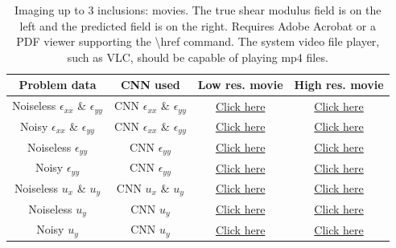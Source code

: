 \documentclass[12pt]{article}
\begin{document}
\begin{table}
  \centering
  \begin{tabular}{|c|c|c|c|}
    \hline
    Problem data & CNN used & Low res. movie  & High res. movie\\
    \hline
    Noiseless $\epsilon_{xx}$ \& $\epsilon_{yy}$ & CNN $\epsilon_{xx}$ \& $\epsilon_{yy}$ &
    \href{run:movies/three/field\_strainxxyy\_noise\_0.0\_movie.mp4}{Click here} & 
    \href{run:movies\_hi\_res/three/field\_strainxxyy\_noise\_0.0\_movie\_hires.mp4}{Click here}\\
    \hline
    Noisy $\epsilon_{xx}$ \& $\epsilon_{yy}$ & CNN $\epsilon_{xx}$ \& $\epsilon_{yy}$ &
    \href{run:movies/three/field\_strainxxyy\_noise\_0.02\_movie.mp4}{Click here} &
    \href{run:movies\_hi\_res/three/field\_strainxxyy\_noise\_0.02\_movie\_hires.mp4}{Click here}\\ 
    \hline
    Noiseless $\epsilon_{yy}$ & CNN $\epsilon_{yy}$ &
    \href{run:movies/three/field\_strainyy\_noise\_0.0\_movie.mp4}{Click here} &
    \href{run:movies\_hi\_res/three/field\_strainyy\_noise\_0.0\_movie\_hires.mp4}{Click here}\\
    \hline
    Noisy $\epsilon_{yy}$ & CNN $\epsilon_{yy}$ &
    \href{run:movies/three/field\_strainyy\_noise\_0.02\_movie.mp4}{Click here} &
    \href{run:movies\_hi\_res/three/field\_strainyy\_noise\_0.02\_movie\_hires.mp4}{Click here}\\
    \hline
    Noiseless $u_x$ \& $u_y$ & CNN $u_x$ \& $u_y$ &
    \href{run:movies/three/field\_images\_noise\_0.0\_movie.mp4}{Click here} &
    \href{run:movies\_hi\_res/three/field\_images\_noise\_0.0\_movie\_hires.mp4}{Click here}\\
    \hline
    Noiseless $u_y$ & CNN $u_y$ &
    \href{run:movies/three/field\_imagesy\_noise\_0.0\_movie.mp4}{Click here} &
    \href{run:movies\_hi\_res/three/field\_imagesy\_noise\_0.0\_movie\_hires.mp4}{Click here}\\
    \hline
    Noisy $u_y$ & CNN $u_y$ &
    \href{run:movies/three/field\_imagesy\_noise\_0.02\_movie.mp4}{Click here} &
    \href{run:movies\_hi\_res/three/field\_imagesy\_noise\_0.02\_movie\_hires.mp4}{Click here}\\
    \hline
  \end{tabular}
  \caption{\label{fig:threeinc:movie} Imaging up to 3 inclusions: movies. The true shear modulus field is on the left and the predicted field is on the right. Requires Adobe Acrobat or a PDF viewer supporting the \textbackslash{href} command. The system video file player, such as VLC, should be capable of playing mp4 files.}
\end{table}
\end{document}
